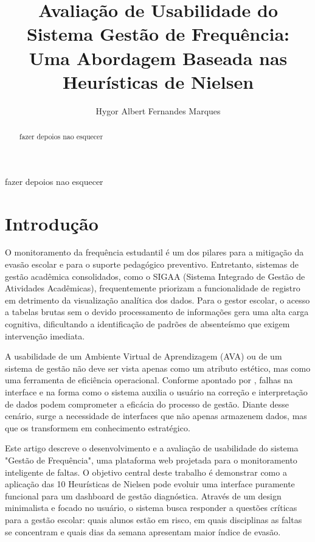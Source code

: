 \documentclass[12pt]{article}
\title{Avaliação de Usabilidade do Sistema Gestão de Frequência: \\ Uma Abordagem Baseada nas Heurísticas de Nielsen}
\author{Hygor Albert Fernandes Marques\inst{1}}
\begin{document}
 

\maketitle

\begin{abstract}
  fazer depoios nao esquecer
\end{abstract}
     
\begin{resumo} 
  fazer depoios nao esquecer
\end{resumo}


\section{Introdução}

O monitoramento da frequência estudantil é um dos pilares para a mitigação da evasão escolar e para o suporte pedagógico preventivo. 
Entretanto, sistemas de gestão acadêmica consolidados, como o SIGAA (Sistema Integrado de Gestão de Atividades Acadêmicas), 
frequentemente priorizam a funcionalidade de registro em detrimento da visualização analítica dos dados.
Para o gestor escolar, o acesso a tabelas brutas sem o devido processamento de informações gera uma alta carga cognitiva, 
dificultando a identificação de padrões de absenteísmo que exigem intervenção imediata.

A usabilidade de um Ambiente Virtual de Aprendizagem (AVA) ou de um sistema de gestão não deve ser vista apenas como um atributo estético, 
mas como uma ferramenta de eficiência operacional. Conforme apontado por \cite{antonino}, falhas na interface e na forma como o 
sistema auxilia o usuário na correção e interpretação de dados podem comprometer a eficácia do processo de gestão. 
Diante desse cenário, surge a necessidade de interfaces que não apenas armazenem dados, mas que os transformem em conhecimento estratégico.

Este artigo descreve o desenvolvimento e a avaliação de usabilidade do sistema "Gestão de Frequência", 
uma plataforma web projetada para o monitoramento inteligente de faltas. O objetivo central deste trabalho é 
demonstrar como a aplicação das 10 Heurísticas de Nielsen pode evoluir uma interface puramente funcional para um 
dashboard de gestão diagnóstica. Através de um design minimalista e focado no usuário, o sistema busca responder a questões 
críticas para a gestão escolar: quais alunos estão em risco, em quais disciplinas as faltas se concentram e quais dias da 
semana apresentam maior índice de evasão.
\end{document}
